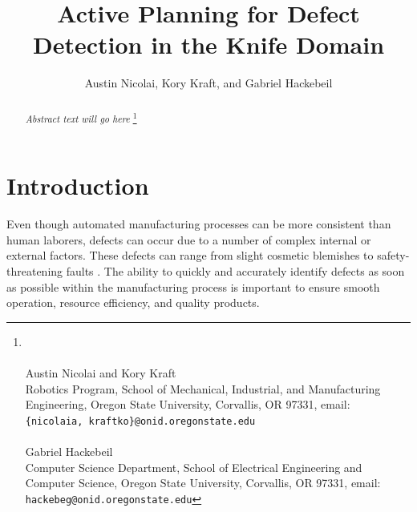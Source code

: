 \documentclass[letterpaper, 10 pt, conference]{ieeeconf}  %
\title{\LARGE \bf 
Active Planning for Defect Detection in the Knife Domain
}
\author{Austin Nicolai, Kory Kraft, and Gabriel Hackebeil}
\begin{document}
\maketitle
\thispagestyle{empty}
\pagestyle{empty}

\begin{abstract}
\textit{Abstract text will go here}
\let\thefootnote\relax\footnote{\hrulefill
\\\hspace*{1em} \hfill
\\\hspace*{1em} Austin Nicolai and Kory Kraft
\\\hspace*{1em} Robotics Program, School of Mechanical, Industrial, and Manufacturing
\\\hspace*{1em} Engineering, Oregon State University, Corvallis, OR 97331, email: 
\\\hspace*{1em} {\tt\small \{nicolaia, kraftko\}@onid.oregonstate.edu}
\\\hspace*{1em} \hfill
\\\hspace*{1em} Gabriel Hackebeil
\\\hspace*{1em} Computer Science Department, School of Electrical Engineering and
\\\hspace*{1em} Computer Science, Oregon State University, Corvallis, OR 97331, email: 
\\\hspace*{1em} {\tt\small hackebeg@onid.oregonstate.edu}
}
\end{abstract}


\section{Introduction}

Even though automated manufacturing processes can be more consistent than human laborers, defects can occur due to a number of complex internal or external factors. These defects can range from slight cosmetic blemishes to safety-threatening faults \cite{matScience}. The ability to quickly and accurately identify defects as soon as possible within the manufacturing process is important to ensure smooth operation, resource efficiency, and quality products. 
\end{document}
